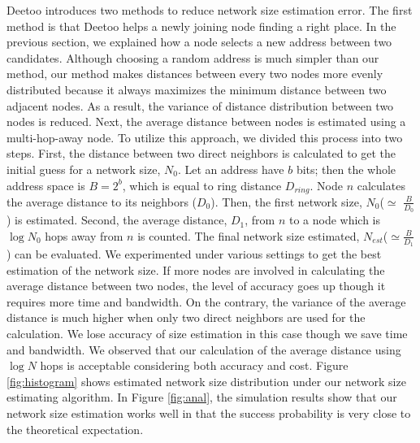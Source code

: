\documentclass[9.5pt,journal,final,finalsubmission,twocolumn]{IEEEtran}
\begin{document}
Deetoo introduces two methods to reduce network size estimation error. 
The first method is that Deetoo helps a newly joining node finding a 
right place. In the previous section, we explained 
how a node selects a new address between two candidates. 
Although choosing a random address is much simpler than our method, 
our method makes distances between every two nodes more evenly distributed 
because it always maximizes the minimum distance between two adjacent nodes. 
As a result, the variance of distance distribution between two nodes is reduced.  
Next, the average distance between nodes is estimated using a multi-hop-away node. 
To utilize this approach, we divided this process into two steps. 
First, the distance between two direct neighbors is calculated 
to get the initial guess for a network size, $N_0$.
Let an address have $b$ bits; then the whole address space is $B=2^{b}$, which
is equal to ring distance $D_{ring}$.  Node $n$ calculates the 
average distance to its neighbors ($D_0$). Then, the first
network size, $N_0$($\simeq$ $\frac{B}{D_0}$) is estimated. 
Second, the average distance, $D_1$, from $n$ to a node 
which is $\log N_0$ hops away from $n$ is counted. The final network size 
estimated, $N_{est}$($\simeq \frac{B}{D_1}$) can be evaluated.
We experimented under various settings to get the best estimation 
of the network size. If more nodes are involved in calculating the average 
distance between two nodes, the level of accuracy goes up though it requires 
more time and bandwidth. On the contrary, the variance of the average distance 
is much higher when only two direct neighbors are used for the calculation. 
We lose accuracy of size estimation in this case though we save 
time and bandwidth.
We observed that our calculation of the average distance using $\log N$ 
hops is acceptable considering both accuracy and cost. 
Figure \ref{fig:histogram} shows estimated network size distribution under our 
network size estimating algorithm. 
In Figure \ref{fig:anal}, the simulation results show that our network 
size estimation works well in that the success probability is very close to 
the theoretical expectation.
\end{document}
